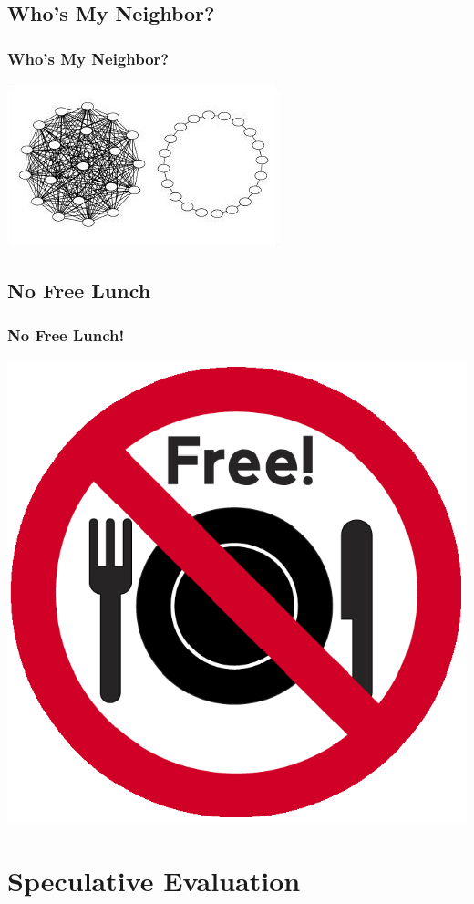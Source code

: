 \documentclass{beamer}
\begin{document}
\subsection{Who's My Neighbor?}
\begin{frame}
  \frametitle{Who's My Neighbor?}
  \includegraphics[width=\textwidth]{gbest_and_lbest}
\end{frame}

\subsection{No Free Lunch}
\begin{frame}
  \frametitle{No Free Lunch!}
  \includegraphics[width=.6\textwidth]{no-free-lunch}
\end{frame}

\section{Speculative Evaluation}
\end{document}
